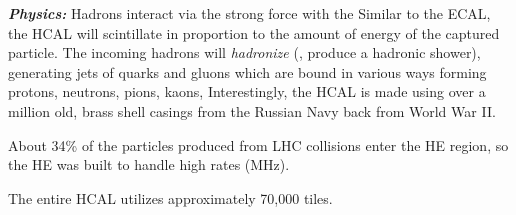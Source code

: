 \textit{\textbf{Physics:}}
Hadrons interact via the strong force with the Similar to the ECAL, the HCAL will scintillate in proportion to the amount of energy of the captured particle. 
The incoming hadrons will \emph{hadronize} (\ie, produce a hadronic shower), generating jets of quarks and gluons which are bound in various ways forming protons, neutrons, pions, kaons, \etc
Interestingly, the HCAL is made using over a million old, brass shell casings from the Russian Navy back from World War II.

About 34\% of the particles produced from LHC \pp collisions enter the HE region, so the HE was built to handle high rates (MHz).

The entire HCAL utilizes approximately 70,000 tiles.
